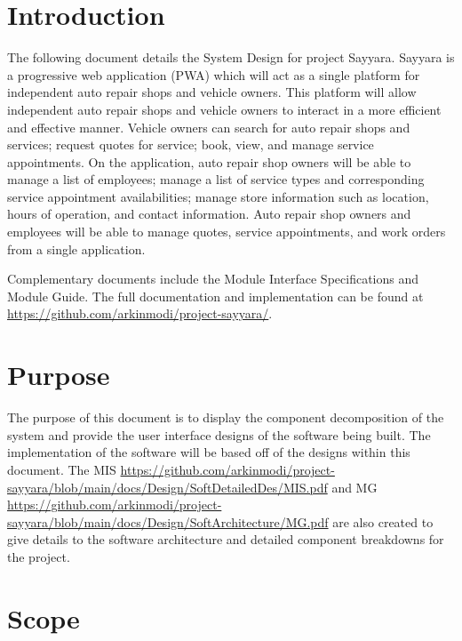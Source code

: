 \documentclass[12pt, titlepage]{article}
\begin{document}
\newpage

\tableofcontents

\newpage

\listoftables

\listoffigures

\newpage


\section{Introduction}

The following document details the System Design for project Sayyara. Sayyara is a progressive web
application (PWA) which will act as a single platform for independent auto repair shops and vehicle
owners. This platform will allow independent auto repair shops and vehicle owners to interact in a
more efficient and effective manner. Vehicle owners can search for auto repair shops and services;
request quotes for service; book, view, and manage service appointments. On the application, auto
repair shop owners will be able to manage a list of employees; manage a list of service types and
corresponding service appointment availabilities; manage store information such as location, hours
of operation, and contact information. Auto repair shop owners and employees will be able to manage
quotes, service appointments, and work orders from a single application.

Complementary documents include the Module Interface Specifications and Module Guide. The full
documentation and implementation can be found at
\url{https://github.com/arkinmodi/project-sayyara/}.

\section{Purpose}

The purpose of this document is to display the component decomposition of the system and provide
the user interface designs of the software being built. The implementation of the software will be
based off of the designs within this document. The MIS
\url{https://github.com/arkinmodi/project-sayyara/blob/main/docs/Design/SoftDetailedDes/MIS.pdf}
and MG
\url{https://github.com/arkinmodi/project-sayyara/blob/main/docs/Design/SoftArchitecture/MG.pdf}
are also created to give details to the software architecture and detailed component breakdowns for
the project.

\section{Scope}
\end{document}
